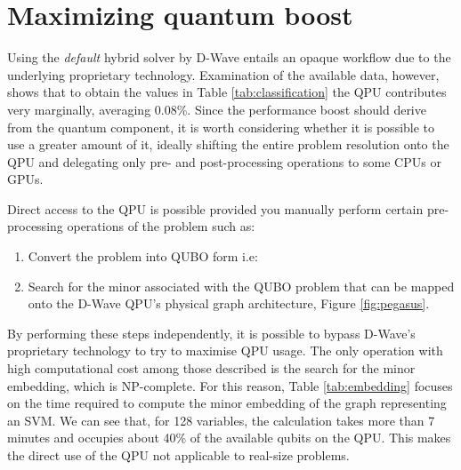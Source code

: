 \documentclass{ceurart}
\begin{document}
\section{Maximizing quantum boost}

Using the \emph{default} hybrid solver by D-Wave entails an opaque workflow due to the underlying proprietary technology. Examination of the available data, however, shows that to obtain the values in Table \ref{tab:classification} the QPU contributes very marginally, averaging 0.08\%. Since the performance boost should derive from the quantum component, it is worth considering whether it is possible to use a greater amount of it, ideally shifting the entire problem resolution onto the QPU and delegating only pre- and post-processing operations to some CPUs or GPUs.

Direct access to the QPU is possible provided you manually perform certain pre-processing operations of the problem such as:
\begin{enumerate}
    \item Convert the problem into QUBO form i.e:
    \item Search for the minor\cite{ME}\cite{MEdwave} associated with the QUBO problem that can be mapped onto the D-Wave QPU's physical graph architecture, Figure \ref{fig:pegasus}.
\end{enumerate}

By performing these steps independently, it is possible to bypass D-Wave's proprietary technology to try to maximise QPU usage. The only operation with high computational cost among those described is the search for the minor embedding, which is NP-complete. For this reason, Table \ref{tab:embedding} focuses on the time required to compute the minor embedding of the graph representing an SVM. We can see that, for 128 variables, the calculation takes more than 7 minutes and occupies about 40\% of the available qubits on the QPU. This makes the direct use of the QPU not applicable to real-size problems.
\end{document}

